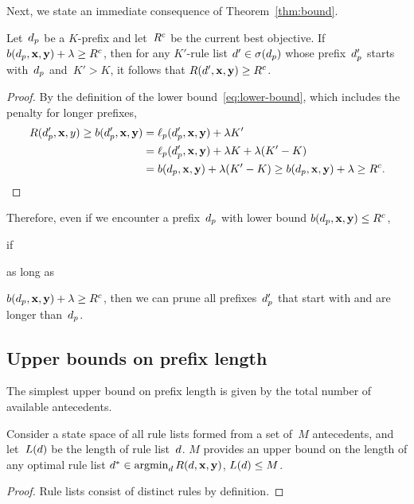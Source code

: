 Next, we state an immediate consequence of Theorem~\ref{thm:bound}.

\begin{lemma}
\label{lemma:lookahead}
Let~$d_p$ be a $K$-prefix
and let~${R^c}$ be the current best objective.
%
If ${b(d_p, \mathbf{x}, \mathbf{y}) + {\lambda} \ge {R^c}}$,
then for any $K'$-rule list ${{d}' \in \sigma(d_p)}$
whose prefix~$d_p'$ starts with~$d_p$ and~${K' > K}$,
it follows that ${R({d}', \mathbf{x}, \mathbf{y}) \ge {R^c}}$.
\end{lemma}

\begin{arxiv}
\begin{proof}
By the definition of the lower bound~\eqref{eq:lower-bound},
which includes the penalty for longer prefixes,
\begin{align}
R(d_p', \mathbf{x}, y) \ge b(d_p', \mathbf{x}, \mathbf{y}) &= \ell_p(d_p', \mathbf{x}, \mathbf{y}) + {\lambda} K' \nonumber \\
&= \ell_p(d_p', \mathbf{x}, \mathbf{y}) + {\lambda} K + {\lambda} (K' - K) \nonumber \\
&= b(d_p, \mathbf{x}, \mathbf{y}) + {\lambda} (K' - K)
\ge b(d_p, \mathbf{x}, \mathbf{y}) + {\lambda} \ge {R^c}.
\label{eq:lookahead}
\end{align}
\end{proof}
\end{arxiv}

Therefore, even if we encounter a prefix~$d_p$
with lower bound ${b(d_p, \mathbf{x}, \mathbf{y}) \le {R^c}}$,
\begin{kdd}
if
\end{kdd}
\begin{arxiv}
as long as
\end{arxiv}
${b(d_p, \mathbf{x}, \mathbf{y}) + {\lambda} \ge {R^c}}$, then we can prune
all prefixes~$d_p'$ that start with and are longer than~$d_p$.

\subsection{Upper bounds on prefix length}
\label{sec:ub-prefix-length}

\begin{arxiv}
The simplest upper bound on prefix length is given by the total
number of available antecedents.

\begin{proposition}
\label{prop:trivial-length}
Consider a state space of all rule lists formed from
a set of~$M$ antecedents,
and let~$L({d})$ be the length of rule list~${d}$.
%
$M$ provides an upper bound on the length of
any optimal rule list
${d^* \in \operatorname*{argmin}_{d} R({d}, \mathbf{x}, \mathbf{y})}$,
\ie ${L({d}) \le M}$.
\end{proposition}

\begin{proof}
Rule lists consist of distinct rules by definition.
\end{proof}
\end{arxiv}

